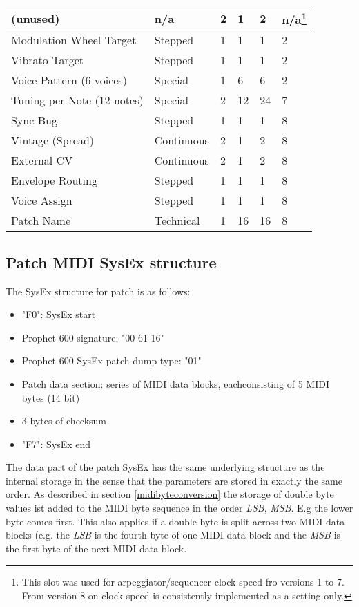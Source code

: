 \begin{longtable}[l]{|p{5cm}|p{2cm}|p{1.5cm}|p{1.5cm}|p{1.5cm}|p{1.5cm}|}
(unused) & n/a & 2 & 1 & 2 & n/a\footnote{This slot was used for arpeggiator/sequencer clock speed fro versions 1 to 7. From version 8 on clock speed is consistently implemented as a setting only.} \\ \hline
Modulation Wheel Target & Stepped & 1 & 1 & 1 & 2 \\ \hline
Vibrato Target & Stepped & 1 & 1 & 1 & 2 \\ \hline
Voice Pattern (6 voices) & Special & 1 & 6 & 6 & 2 \\ \hline
Tuning per Note (12 notes) & Special & 2 & 12 & 24 & 7 \\ \hline
Sync Bug & Stepped & 1 & 1 & 1 & 8 \\ \hline
Vintage (Spread) & Continuous & 2 & 1 & 2 & 8 \\ \hline
External CV & Continuous & 2 & 1 & 2 & 8 \\ \hline
Envelope Routing & Stepped & 1 & 1 & 1 & 8 \\ \hline
Voice Assign & Stepped & 1 & 1 & 1 & 8 \\ \hline
Patch Name & Technical & 1 & 16 & 16 & 8 \\ \hline
\end{longtable}

\subsection{Patch MIDI SysEx structure}

The SysEx structure for patch is as follows:

\begin{itemize}
  \item "F0": SysEx start
  \item Prophet 600 signature: "00 61 16"
  \item Prophet 600 SysEx patch dump type: "01"
  \item Patch data section: series of MIDI data blocks, eachconsisting of 5 MIDI bytes (14 bit) 
  \item 3 bytes of checksum
  \item "F7": SysEx end
\end{itemize}

The data part of the patch SysEx has the same underlying structure as the internal storage in the sense that the parameters are stored in exactly the same order. As described in section \ref{midibyteconversion} the storage of double  byte values ist added to the MIDI byte sequence in the order \textit{LSB}, \textit{MSB}. E.g the lower byte comes first. This also applies if a double byte is split across two MIDI data blocks (e.g. the \textit{LSB} is the fourth byte of one MIDI data block and the \textit{MSB} is the first byte of the next MIDI data block. 

